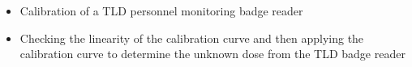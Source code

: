 \begin{itemize}
    \item Calibration of a TLD personnel monitoring badge reader
    \item Checking the linearity of the calibration curve and then applying the calibration curve to determine the unknown dose from the TLD badge reader
\end{itemize}


